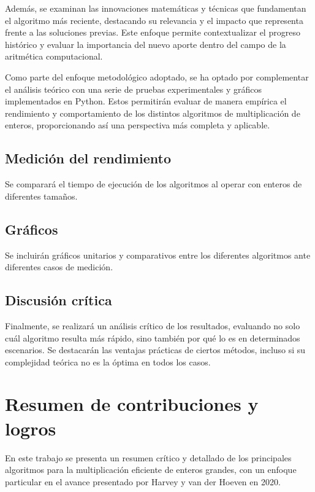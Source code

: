 Además, se examinan las innovaciones matemáticas y técnicas que fundamentan el algoritmo más reciente, destacando su relevancia y el impacto que representa frente a las soluciones previas. Este enfoque permite contextualizar el progreso histórico y evaluar la importancia del nuevo aporte dentro del campo de la aritmética computacional.

Como parte del enfoque metodológico adoptado, se ha optado por complementar el análisis teórico con una serie de pruebas experimentales y gráficos implementados en Python. Estos permitirán evaluar de manera empírica el rendimiento y comportamiento de los distintos algoritmos de multiplicación de enteros, proporcionando así una perspectiva más completa y aplicable.

\subsection{Medición del rendimiento}
\label{sec:intro_some_sub1}
Se comparará el tiempo de ejecución de los algoritmos al operar con enteros de diferentes tamaños.

\subsection{Gráficos}
\label{sec:intro_some_sub3}
Se incluirán gráficos unitarios y comparativos entre los diferentes algoritmos ante diferentes casos de medición. 

\subsection{Discusión crítica}
\label{sec:intro_some_sub4}
Finalmente, se realizará un análisis crítico de los resultados, evaluando no solo cuál algoritmo resulta más rápido, sino también por qué lo es en determinados escenarios. Se destacarán las ventajas prácticas de ciertos métodos, incluso si su complejidad teórica no es la óptima en todos los casos.

\section{Resumen de contribuciones y logros} %
\label{sec:intro_sum_results} %
En este trabajo se presenta un resumen crítico y detallado de los principales algoritmos para la multiplicación eficiente de enteros grandes, con un enfoque particular en el avance presentado por Harvey y van der Hoeven en 2020.


